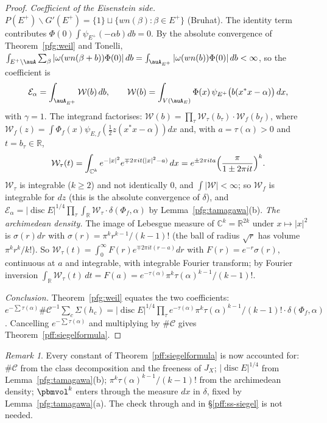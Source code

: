 \documentclass[10pt]{amsart}
\theoremstyle{definition}
\theoremstyle{remark}
\newtheorem{remark}[theorem]{Remark}
\newcommand{\C}{\mathbb C}
\newcommand{\R}{\mathbb R}
\begin{document}
\begin{proof}
\emph{Coefficient of the Eisenstein side.} $P(E^+)\backslash G'(E^+)=\{1\}\sqcup\{wn(\beta):\beta\in E^+\}$ (Bruhat). The
identity term contributes $\Phi(0)\int\psi_{E^+}(-\alpha b)db=0$. By the absolute convergence of Theorem~\ref{pfg:weil} and
Tonelli, $\int_{E^+\backslash\auA}\sum_\beta|\omega(wn(\beta+b))\Phi(0)|\,db=\int_{\auA_{E^+}}|\omega(wn(b))\Phi(0)|\,db<\infty$, so
the coefficient is
\[
\mathcal E_\alpha=\int_{\auA_{E^+}}\mathcal W(b)\,db,\qquad\mathcal W(b)=\int_{V(\auA_E)}\Phi(x)\,\psi_{E^+}\bigl(b(x^*x-\alpha)\bigr)\,dx ,
\]
with $\gamma=1$. The integrand factorises: $\mathcal W(b)=\prod_\tau\mathcal W_\tau(b_\tau)\cdot\mathcal W_f(b_f)$, where
$\mathcal W_f(z)=\int\Phi_f(x)\psi_{E,f}(\tfrac12z(x^*x-\alpha))dx$ and, with $a=\tau(\alpha)>0$ and $t=b_\tau\in\R$,
\[
\mathcal W_\tau(t)=\int_{\C^k}e^{-|x|^2}e^{\mp2\pi it(|x|^2-a)}\,dx=e^{\pm2\pi ita}\Bigl(\frac\pi{1\pm2\pi it}\Bigr)^k .
\]
$\mathcal W_\tau$ is integrable ($k\ge2$) and not identically $0$, and $\int|\mathcal W|<\infty$; so $\mathcal W_f$ is integrable for
$dz$ (this is the absolute convergence of $\delta$), and $\mathcal E_\alpha=|\operatorname{disc}E|^{1/4}\prod_\tau\int_\R
\mathcal W_\tau\cdot\delta(\Phi_f,\alpha)$ by Lemma~\ref{pfg:tamagawa}(b). \emph{The archimedean density.} The image of Lebesgue
measure of $\C^k=\R^{2k}$ under $x\mapsto|x|^2$ is $\sigma(r)dr$ with $\sigma(r)=\pi^kr^{k-1}/(k-1)!$ (the ball of radius
$\sqrt r$ has volume $\pi^kr^k/k!$). So $\mathcal W_\tau(t)=\int_0^\infty F(r)e^{\mp2\pi it(r-a)}dr$ with $F(r)=e^{-r}\sigma(r)$,
continuous at $a$ and integrable, with integrable Fourier transform; by Fourier inversion
$\int_\R\mathcal W_\tau(t)\,dt=F(a)=e^{-\tau(\alpha)}\pi^k\tau(\alpha)^{k-1}/(k-1)!$.

\emph{Conclusion.} Theorem~\ref{pfg:weil} equates the two coefficients:
$e^{-\sum\tau(\alpha)}\#\mathcal C^{-1}\sum_c\Sigma(h_c)=|\operatorname{disc}E|^{1/4}\allowbreak \prod_\tau e^{-\tau(\alpha)}\allowbreak \pi^k\tau(\alpha)^{k-1}
/(k-1)!\cdot\delta(\Phi_f,\alpha)$. Cancelling $e^{-\sum\tau(\alpha)}$ and multiplying by $\#\mathcal C$ gives
Theorem~\ref{pff:siegelformula}.
\end{proof}

\begin{remark}\label{pfg:rem-siegel}
Every constant of Theorem~\ref{pff:siegelformula} is now accounted for: $\#\mathcal C$ from the class decomposition and the
freeness of $J_X$; $|\operatorname{disc}E|^{1/4}$ from Lemma~\ref{pfg:tamagawa}(b); $\pi^k\tau(\alpha)^{k-1}/(k-1)!$ from the
archimedean density; $\pbmvol^k$ enters through the measure $dx$ in $\delta$, fixed by Lemma~\ref{pfg:tamagawa}(a). The check
through {\cite[Lemma~2.21]{P51}} and \cite{GHY} in \S\ref{pff:ss-siegel} is not needed.
\end{remark}
\end{document}
